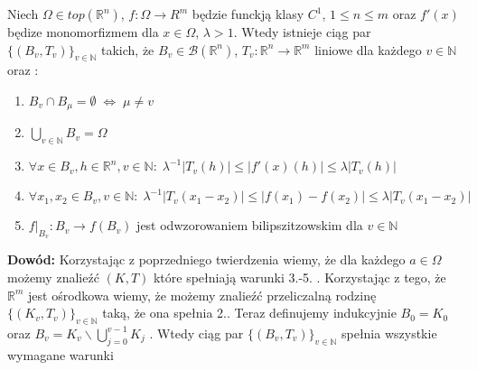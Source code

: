 \begin{lem}
	Niech $\Omega \in top(\mathbb{R}^n)$, $f: \Omega \rightarrow \mathbb{}R^m$  będzie funckją klasy $C^1$, $1 \leq n \leq m$ oraz $f'(x)$ będize monomorfizmem dla $x \in \Omega$, $\lambda > 1$. Wtedy istnieje ciąg par $\{(B_v, T_v)\}_{v \in \mathbb{N}}$ takich, że $B_v \in \mathcal{B}(\mathbb{R}^n)$, $T_v: \mathbb{R}^n \rightarrow \mathbb{R}^m$ liniowe dla każdego $v \in \mathbb{N}$ oraz :
	\begin{enumerate}
		\item $B_v \cap B_{\mu} = \emptyset \; \Leftrightarrow \; \mu \neq v$ 
		\item $\bigcup_{v \in \mathbb{N}} B_v = \Omega$ 
		\item $\forall x \in B_v, h \in \mathbb{R}^n, v \in \mathbb{N}: \; \lambda^{-1}|T_v(h)| \leq |f'(x)(h)| \leq \lambda|T_v(h)|$
		\item $\forall x_1, x_2 \in B_v, v \in \mathbb{N}: \; \lambda^{-1}|T_v(x_1 - x_2)| \leq |f(x_1) - f(x_2)| \leq \lambda|T_v(x_1 - x_2)|$
		\item $f|_{B_v}: B_v \rightarrow f(B_v)$ jest odwzorowaniem bilipszitzowskim dla $v \in \mathbb{N}$ 
	\end{enumerate}

	\textbf{Dowód:}\newline
	Korzystając z poprzedniego twierdzenia wiemy, że dla każdego $a \in \Omega$ możemy znalieźć $(K, T)$ które spełniają warunki 3.-5. . Korzystając z tego, że $\mathbb{R}^m$ jest ośrodkowa wiemy, że możemy znalieźć przeliczalną rodzinę $\{(K_v, T_v)\}_{v \in \mathbb{N}}$ taką, że ona spełnia 2.. Teraz definujemy indukcyjnie $B_0 = K_0$ oraz $B_v = K_{v} \backslash \bigcup_{j=0}^{v-1} K_j$ . Wtedy ciąg par $\{(B_v, T_v)\}_{v \in \mathbb{N}}$ spełnia wszystkie wymagane warunki
\end{lem}